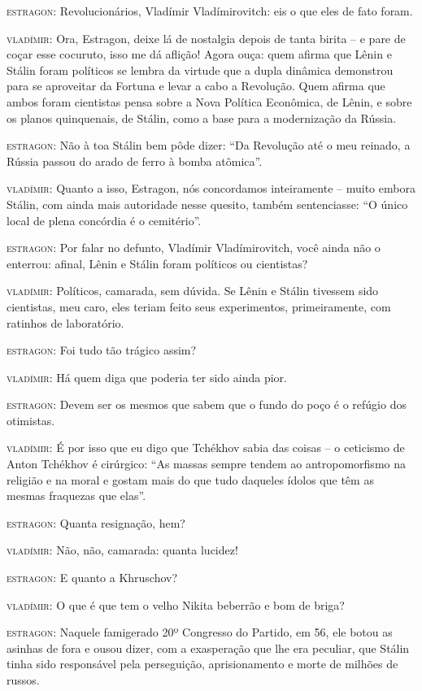 \textsc{estragon:} Revolucionários, Vladímir Vladímirovitch: eis o que
eles de fato foram.

\textsc{vladímir:} Ora, Estragon, deixe lá de nostalgia depois de tanta
birita -- e pare de coçar esse cocuruto, isso me dá aflição! Agora ouça:
quem afirma que Lênin e Stálin foram políticos se lembra da virtude que
a dupla dinâmica demonstrou para se aproveitar da Fortuna e levar a cabo
a Revolução. Quem afirma que ambos foram cientistas pensa sobre a Nova
Política Econômica, de Lênin, e sobre os planos quinquenais, de Stálin,
como a base para a modernização da Rússia.

\textsc{estragon:} Não à toa Stálin bem pôde dizer: ``Da Revolução até o
meu reinado, a Rússia passou do arado de ferro à bomba atômica''.

\textsc{vladímir:} Quanto a isso, Estragon, nós concordamos inteiramente
-- muito embora Stálin, com ainda mais autoridade nesse quesito, também
sentenciasse: ``O único local de plena concórdia é o cemitério''.

\textsc{estragon:} Por falar no defunto, Vladímir Vladímirovitch, você
ainda não o enterrou: afinal, Lênin e Stálin foram políticos ou
cientistas?

\textsc{vladímir:} Políticos, camarada, sem dúvida. Se Lênin e Stálin
tivessem sido cientistas, meu caro, eles teriam feito seus experimentos,
primeiramente, com ratinhos de laboratório.

\textsc{estragon:} Foi tudo tão trágico assim?

\textsc{vladímir:} Há quem diga que poderia ter sido ainda pior.

\textsc{estragon:} Devem ser os mesmos que sabem que o fundo do poço é o
refúgio dos otimistas.

\textsc{vladímir:} É por isso que eu digo que Tchékhov sabia das coisas
-- o ceticismo de Anton Tchékhov é cirúrgico: ``As massas sempre tendem
ao antropomorfismo na religião e na moral e gostam mais do que tudo
daqueles ídolos que têm as mesmas fraquezas que elas''.

\textsc{estragon:} Quanta resignação, hem?

\textsc{vladímir:} Não, não, camarada: quanta lucidez!

\textsc{estragon:} E quanto a Khruschov?

\textsc{vladímir:} O que é que tem o velho Nikita beberrão e bom de
briga?

\textsc{estragon:} Naquele famigerado 20º Congresso do Partido, em 56,
ele botou as asinhas de fora e ousou dizer, com a exasperação que lhe
era peculiar, que Stálin tinha sido responsável pela perseguição,
aprisionamento e morte de milhões de russos.

